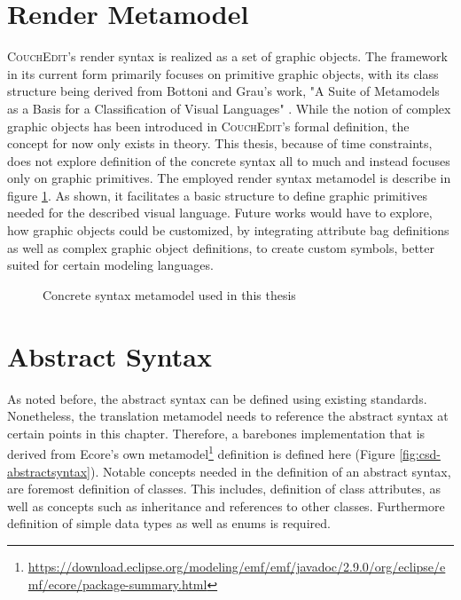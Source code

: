 \section{Render Metamodel}
\textsc{CouchEdit}'s render syntax is realized as a set of graphic objects. The framework in its current form primarily focuses on primitive graphic objects, with its class structure being derived \cite[p.39]{nachreiner_couchedit_2020} from Bottoni and Grau's work, "A Suite of Metamodels as a Basis for a Classification of Visual Languages" \cite{bottoni_suite_2004}. While the notion of complex graphic objects has been introduced in \textsc{CouchEdit}'s formal definition, the concept for now only exists in theory. This thesis, because of time constraints, does not explore definition of the concrete syntax all to much and instead focuses only on graphic primitives. The employed render syntax metamodel is describe in figure \ref{fig:concretesyntax}. As shown, it facilitates a basic structure to define graphic primitives needed for the described visual language. Future works would have to explore, how graphic objects could be customized, by integrating attribute bag definitions as well as complex graphic object definitions, to create custom symbols, better suited for certain modeling languages.

\begin{figure}
  \centering
  
  \caption{Concrete syntax metamodel used in this thesis}
  \label{fig:concretesyntax}
\end{figure}


\section{Abstract Syntax}
\label{sec:abstract-syntax}
As noted before, the abstract syntax can be defined using existing standards. Nonetheless, the translation metamodel needs to reference the abstract syntax at certain points in this chapter. Therefore, a barebones implementation that is derived from Ecore's own metamodel\footnote{\url{https://download.eclipse.org/modeling/emf/emf/javadoc/2.9.0/org/eclipse/emf/ecore/package-summary.html}} definition is defined here (Figure \ref{fig:csd-abstractsyntax}). Notable concepts needed in the definition of an abstract syntax, are foremost definition of classes. This includes, definition of class attributes, as well as concepts such as inheritance and references to other classes. Furthermore definition of simple data types as well as enums is required. 

